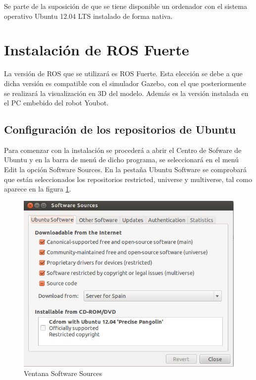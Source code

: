 \documentclass[12pt, a4paper]{report}
\begin{document}
Se parte de la suposición de que se tiene disponible un ordenador con el sistema operativo Ubuntu 12.04 LTS instalado de forma nativa.

\section{Instalación de ROS Fuerte}

La versión de ROS que se utilizará es ROS Fuerte. Esta elección se debe a que dicha versión es compatible con el simulador Gazebo, con el que posteriormente se realizará la visualización en 3D del modelo. Además es la versión instalada en el PC embebido del robot Youbot.\\

\subsection{Configuración de los repositorios de Ubuntu}

Para comenzar con la instalación se procederá a abrir el Centro de Sofware de Ubuntu y en la barra de menú de dicho programa, se seleccionará en el menú Edit la opción Software Sources. En la pestaña Ubuntu Software se comprobará que están seleccionados los repositorios restricted, universe y multiverse, tal como aparece en la figura \ref{fig: software_sources}.\\

\begin{figure}[h]
	\centering
		\includegraphics[scale=0.4]{../img/software_sources.png} 
	\caption[Ventana Software Sources]{Ventana Software Sources} 
	\label{fig: software_sources}
\end{figure}
\end{document}
